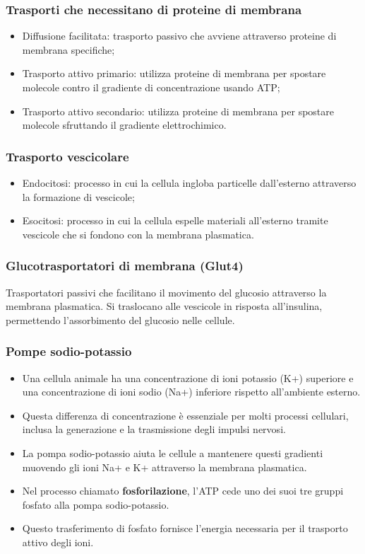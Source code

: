 \documentclass{article}
\begin{document}
\subsubsection{Trasporti che necessitano di proteine di membrana}
\begin{itemize}
    \item Diffusione facilitata: trasporto passivo che avviene attraverso proteine di membrana
        specifiche;
    \item Trasporto attivo primario: utilizza proteine di membrana per spostare molecole contro
        il gradiente di concentrazione usando ATP;
    \item Trasporto attivo secondario: utilizza proteine di membrana per spostare molecole
        sfruttando il gradiente elettrochimico.
\end{itemize}

\subsubsection{Trasporto vescicolare}
\begin{itemize}
    \item Endocitosi: processo in cui la cellula ingloba particelle dall'esterno attraverso la
        formazione di vescicole;
    \item Esocitosi: processo in cui la cellula espelle materiali all'esterno tramite vescicole
        che si fondono con la membrana plasmatica.
\end{itemize}

\subsubsection{Glucotrasportatori di membrana (Glut4)}
Trasportatori passivi che facilitano il movimento del glucosio attraverso la membrana
plasmatica. Si traslocano alle vescicole in risposta all'insulina, permettendo l'assorbimento
del glucosio nelle cellule.

\newpage
\subsubsection{Pompe sodio-potassio}
\begin{itemize}
    \item Una cellula animale ha una concentrazione di ioni potassio (K+) superiore e una
        concentrazione di ioni sodio (Na+) inferiore rispetto all'ambiente esterno.
    \item Questa differenza di concentrazione è essenziale per molti processi cellulari,
        inclusa la generazione e la trasmissione degli impulsi nervosi.
    \item La pompa sodio-potassio aiuta le cellule a mantenere questi gradienti muovendo gli
        ioni Na+ e K+ attraverso la membrana plasmatica.
    \item Nel processo chiamato \textbf{fosforilazione}, l'ATP cede uno dei suoi tre gruppi
        fosfato alla pompa sodio-potassio.
    \item Questo trasferimento di fosfato fornisce l'energia necessaria per il trasporto attivo
        degli ioni.
\end{itemize}
\end{document}
